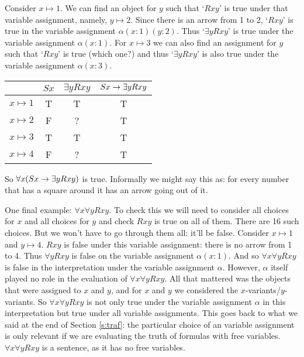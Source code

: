 Consider $x\mapsto 1$. We can find an object for $y$ such that `$Rxy$' is true under that variable assignment, namely, $y\mapsto 2$. Since there is an arrow from 1 to 2, `$Rxy$' is true in the variable assignment $\alpha(x:1)(y:2)$. Thus `$\exists y Rxy$' is true under the variable assignment $\alpha(x:1)$. For $x\mapsto 3$ we can also find an assignment for $y$ such that `$Rxy$' is true (which one?) and thus  `$\exists y Rxy$' is also true under the variable assignment $\alpha(x:3)$.
\begin{center}
\begin{tabular}{c|ccc}
&$Sx$&$\exists y Rxy$&$Sx\rightarrow\exists y Rxy$\Bstrut\\\hline\Tstrut
$x\mapsto 1$&T&T&T\\
$x\mapsto 2$&F&?&T\\
$x\mapsto 3$&T&T&T\\
$x\mapsto 4$&F&?&T
\end{tabular}
\end{center}So $\forall x(Sx\rightarrow \exists y Rxy)$ is true. Informally we might say this as: for every number that has a square around it has an arrow going out of it.

One final example: $\forall x\forall y Rxy$. To check this we will need to consider all choices for $x$ and all choices for $y$ and check $Rxy$ is true on all of them. There are 16 such choices. But we won't have to go through them all: it'll be false. Consider $x\mapsto 1$ and $y\mapsto 4$. $Rxy$ is false under this variable assignment: there is no arrow from 1 to 4. Thus $\forall yRxy$ is false on the variable assignment $\alpha(x:1)$. And so $\forall x\forall y Rxy$ is false in the interpretation under the variable assignment $\alpha$. However, $\alpha$ itself played no role in the evaluation of $\forall x\forall y Rxy$. All that mattered was the objects that were assigned to $x$ and $y$, and for $x$ and $y$ we considered the $x$-variants/$y$-variants. So $\forall x\forall y Rxy$ is not only true under the variable assignment $\alpha$ in this interpretation but true under all variable assignments. This goes back to what we said at the end of Section \ref{s:traf}: the particular choice of an variable assignment is only relevant if we are evaluating the truth of formulas with free variables. $\forall x\forall y Rxy$ is a sentence, as it has no free variables.

